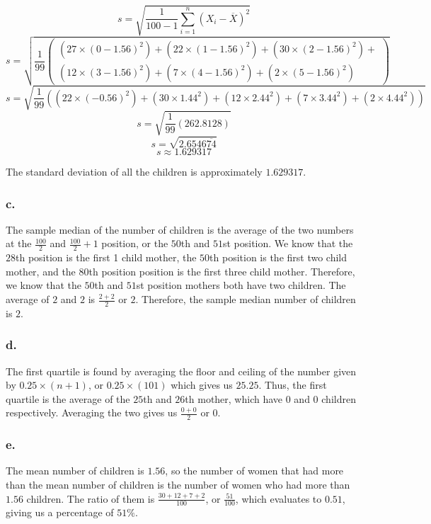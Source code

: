 \documentclass[11pt]{article}
\begin{document}
\[s = \sqrt{\frac{1}{100-1}\sum\limits_{i=1}^{n}{(X_i-\overline X)}^2}\]
\[s = \sqrt{
    \frac{1}{99}
    \left(\begin{array}{c}\left( 27 \times {(0-1.56)}^2 \right) + 
        \left(22 \times {(1-1.56)}^2 \right) + \left( 30 \times {(2-1.56)}^2 \right) +\\
        \left( 12 \times {(3-1.56)}^2 \right) + \left( 7 \times {(4-1.56)}^2 \right) + 
        \left( 2 \times {(5-1.56)}^2 \right)
    \end{array}\right)
    }
\]
\[s = \sqrt{\frac{1}{99}\left(\left(22 \times
    {(-0.56)}^2\right) + \left(30 \times 1.44^2\right) + \left(12 \times 2.44^2\right)
    + \left( 7 \times 3.44^2\right) + \left(2 \times 4.44^2\right)\right) }\]
\[s = \sqrt{\frac{1}{99}\left(262.8128\right)}\]
\[s = \sqrt{2.6546\overline{74}}\]
\[s \approx 1.629317\] 

The standard deviation of all the children is approximately $1.629317$. 

\subsubsection*{c.}
The sample median of the number of children is the average of the two numbers at
the $\frac{100}{2}$ and $\frac{100}{2} + 1$ position, or the $50$th and $51$st
position. We know that the $28$th position is the first 1 child mother, the $50$th
position is the first two child mother, and the $80$th position position is the
first three child mother. Therefore, we know that the $50$th and $51$st position
mothers both have two children. The average of $2$ and $2$ is $\frac{2+2}{2}$ or
$2$. Therefore, the sample median number of children is $2$.

\subsubsection*{d.}
The first quartile is found by averaging the floor and ceiling of the number
given by $0.25 \times (n + 1)$, or $0.25 \times (101)$ which gives us $25.25$.
Thus, the first quartile is the average of the $25$th and $26$th mother, which
have $0$ and $0$ children respectively. Averaging the two gives us
$\frac{0+0}{2}$ or $0$. 

\subsubsection*{e.}
The mean number of children is $1.56$, so the number of women that had more
than the mean number of children is the number of women who had more than $1.56$
children. The ratio of them is $\frac{30+12+7+2}{100}$, or
$\frac{51}{100}$, which evaluates to $0.51$, giving us a percentage of $51\%$.
\end{document}

